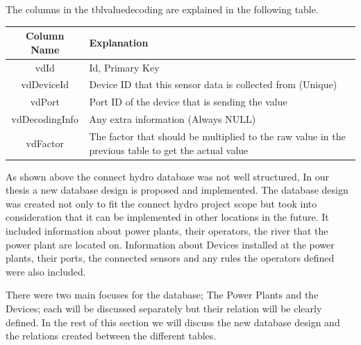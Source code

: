 The columns in the tblvaluedecoding are explained in the following table.
\begin{center}
\begin{tabular}{ |c|p{10cm}| } 
 \hline
 Column Name & Explanation\\ [0.5ex] 
 \hline\hline
vdId & Id, Primary Key\\ 
\hline
vdDeviceId & Device ID that this sensor data is collected from (Unique)\\
\hline
vdPort & Port ID of the device that is sending the value\\ 
\hline
vdDecodingInfo & Any extra information (Always NULL)\\
\hline
vdFactor & The factor that should be multiplied to the raw value in the previous table to get the actual value\\ 
 \hline
\end{tabular}
\end{center}
As shown above the connect hydro database was not well structured, In our thesis a new database design is proposed and implemented. The database design was created not only to fit the connect hydro project scope but took into consideration that it can be implemented in other locations in the future. It included information about power plants, their operators, the river that the power plant are located on. Information about Devices installed at the power plants, their ports, the connected sensors and any rules the operators defined were also included. 

There were two main focuses for the database; The Power Plants and the Devices; each will be discussed separately but their relation will be clearly defined. In the rest of this section we will discuss the new database design and the relations created between the different tables.

